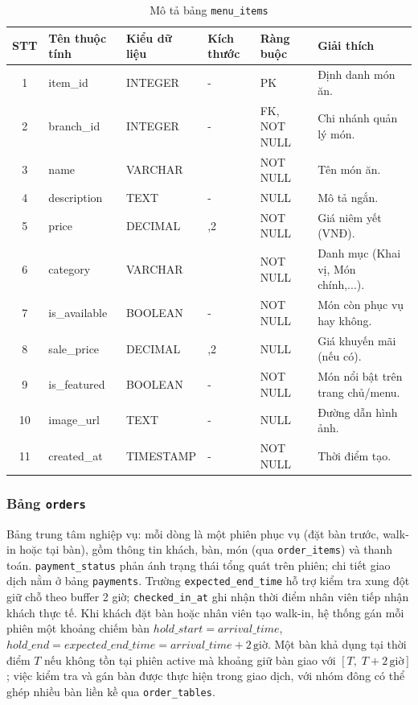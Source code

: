 \documentclass[../DoAn.tex]{subfiles}
\begin{document}
\begin{table}[H]
\centering
\renewcommand{\arraystretch}{1.3}
\small
\begin{tabularx}{\textwidth}{|c|>{\RaggedRight\arraybackslash}p{2.9cm}|>{\Centering\arraybackslash}p{2.2cm}|>{\Centering\arraybackslash}p{1.3cm}|>{\Centering\arraybackslash}p{2.2cm}|>{\RaggedRight\arraybackslash}X|}
\hline
\textbf{STT} & \textbf{Tên thuộc tính} & \textbf{Kiểu dữ liệu} & \textbf{Kích thước} & \textbf{Ràng buộc} & \textbf{Giải thích} \\
\hline
1 & item\_id & INTEGER & - & PK & Định danh món ăn. \\ \hline
2 & branch\_id & INTEGER & - & FK, NOT NULL & Chi nhánh quản lý món. \\ \hline
3 & name & VARCHAR & 50 & NOT NULL & Tên món ăn. \\ \hline
4 & description & TEXT & - & NULL & Mô tả ngắn. \\ \hline
5 & price & DECIMAL & 10,2 & NOT NULL & Giá niêm yết (VNĐ). \\ \hline
6 & category & VARCHAR & 15 & NOT NULL & Danh mục (Khai vị, Món chính,...). \\ \hline
7 & is\_available & BOOLEAN & - & NOT NULL & Món còn phục vụ hay không. \\ \hline
8 & sale\_price & DECIMAL & 10,2 & NULL & Giá khuyến mãi (nếu có). \\ \hline
9 & is\_featured & BOOLEAN & - & NOT NULL & Món nổi bật trên trang chủ/menu. \\ \hline
10 & image\_url & TEXT & - & NULL & Đường dẫn hình ảnh. \\ \hline
11 & created\_at & TIMESTAMP & - & NOT NULL & Thời điểm tạo. \\ \hline
\end{tabularx}
\caption{Mô tả bảng \texttt{menu\_items}}
\end{table}

\subsubsection{Bảng \texttt{orders}}

Bảng trung tâm nghiệp vụ: mỗi dòng là một phiên phục vụ (đặt bàn trước, walk-in hoặc tại bàn),
gồm thông tin khách, bàn, món (qua \texttt{order\_items}) và thanh toán.
\texttt{payment\_status} phản ánh trạng thái tổng quát trên phiên; chi tiết giao dịch nằm ở bảng \texttt{payments}.
Trường \texttt{expected\_end\_time} hỗ trợ kiểm tra xung đột giữ chỗ theo buffer 2 giờ;
\texttt{checked\_in\_at} ghi nhận thời điểm nhân viên tiếp nhận khách thực tế.
Khi khách đặt bàn hoặc nhân viên tạo walk-in, hệ thống gán mỗi phiên một khoảng chiếm bàn
$\mathit{hold\_start}=\mathit{arrival\_time}$, $\mathit{hold\_end}=\mathit{expected\_end\_time}=\mathit{arrival\_time}+2\,\text{giờ}$.
Một bàn khả dụng tại thời điểm $T$ nếu không tồn tại phiên active mà khoảng giữ bàn giao với $[T,\; T+2\,\text{giờ}]$;
việc kiểm tra và gán bàn được thực hiện trong giao dịch, với nhóm đông có thể ghép nhiều bàn liền kề qua \texttt{order\_tables}.
\end{document}
